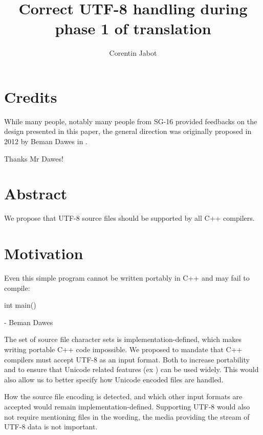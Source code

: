 \documentclass{wg21}
\title{Correct UTF-8 handling during phase 1 of translation}
\author{Corentin Jabot}{corentin.jabot@gmail.com}
\begin{document}
\maketitle


\section{Credits}

While many people, notably many people from SG-16 provided feedbacks on the design presented in this paper,
the general direction was originally proposed in 2012 by Beman Dawes in .

Thanks Mr Dawes!

\section{Abstract}

We propose that UTF-8 source files should be supported by all C++ compilers.

\section{Motivation}

\begin{quoteblock}
    Even this simple program cannot be written portably in C++ and may fail to compile:
\begin{codeblock}
    int main() {}
\end{codeblock}
 - Beman Dawes
\end{quoteblock}

The set of source file character sets is implementation-defined, which makes writing portable C++ code impossible.
We proposed to mandate that C++ compilers must accept UTF-8 as an input format. Both to increase portability and
to ensure that Unicode related features (ex ) can be used widely.
This would also allow us to better specify how Unicode encoded files are handled.

How the source file encoding is detected, and which other input formats are accepted would remain implementation-defined.
Supporting UTF-8 would also not require mentioning files in the wording, the media providing the stream of UTF-8 data is not important.
\end{document}
